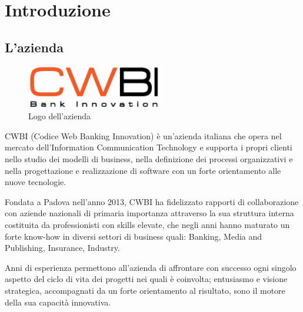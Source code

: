 \chapter{Introduzione}
\label{cap:introduzione}


\setlength{\parskip}{3ex}

\section{L'azienda}

\begin{figure}[!h]
	\centering
	\includegraphics[width=6cm]{../images/CWBI-logo.png}
	\caption{Logo dell'azienda}
\end{figure}

\setlength{\parskip}{3ex}

\noindent CWBI (Codice Web Banking Innovation) è un’azienda italiana che opera nel mercato dell'Information Communication Technology e supporta i propri clienti nello studio dei modelli di business, nella definizione dei processi organizzativi e nella progettazione e realizzazione di software con un forte orientamento alle nuove tecnologie.

\setlength{\parskip}{3ex}

\noindent Fondata a Padova nell'anno 2013, CWBI ha fidelizzato rapporti di collaborazione con aziende nazionali di primaria importanza attraverso la sua struttura interna costituita da professionisti con skills elevate, che negli anni hanno maturato un forte know-how in diversi settori di business quali: Banking, Media and Publishing, Insurance, Industry.

\setlength{\parskip}{3ex}

\noindent Anni di esperienza permettono all'azienda di affrontare con successo ogni singolo aspetto del ciclo di vita dei progetti nei quali è coinvolta; entusiasmo e visione strategica, accompagnati da un forte orientamento al risultato, sono il motore della sua capacità innovativa.

